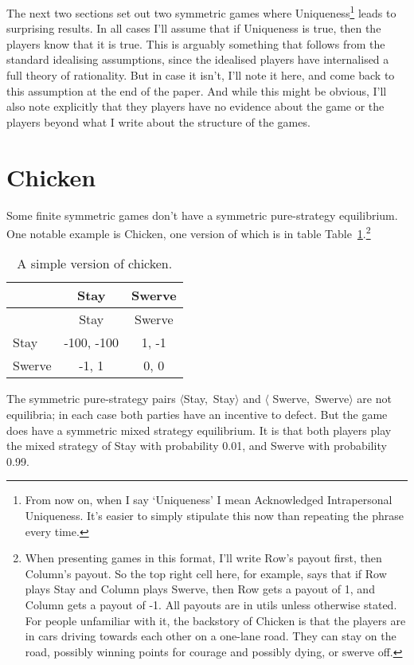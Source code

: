 \documentclass[
  11pt,
  letterpaper,
  DIV=11,
  numbers=noendperiod,
  twoside]{scrartcl}
\begin{document}
The next two sections set out two symmetric games where
Uniqueness\footnote{From now on, when I say `Uniqueness' I mean
  Acknowledged Intrapersonal Uniqueness. It's easier to simply stipulate
  this now than repeating the phrase every time.} leads to surprising
results. In all cases I'll assume that if Uniqueness is true, then the
players know that it is true. This is arguably something that follows
from the standard idealising assumptions, since the idealised players
have internalised a full theory of rationality. But in case it isn't,
I'll note it here, and come back to this assumption at the end of the
paper. And while this might be obvious, I'll also note explicitly that
they players have no evidence about the game or the players beyond what
I write about the structure of the games.

\section{Chicken}\label{chicken}

Some finite symmetric games don't have a symmetric pure-strategy
equilibrium. One notable example is Chicken, one version of which is in
table Table~\ref{tbl-chicken}.\footnote{When presenting games in this
  format, I'll write Row's payout first, then Column's payout. So the
  top right cell here, for example, says that if Row plays Stay and
  Column plays Swerve, then Row gets a payout of 1, and Column gets a
  payout of -1. All payouts are in utils unless otherwise stated. For
  people unfamiliar with it, the backstory of Chicken is that the
  players are in cars driving towards each other on a one-lane road.
  They can stay on the road, possibly winning points for courage and
  possibly dying, or swerve off.}

\begin{longtable}[]{@{}lcc@{}}
\caption{A simple version of chicken.}\label{tbl-chicken}\tabularnewline
\toprule\noalign{}
& Stay & Swerve \\
\midrule\noalign{}
\endfirsthead
\toprule\noalign{}
& Stay & Swerve \\
\midrule\noalign{}
\endhead
\bottomrule\noalign{}
\endlastfoot
Stay & -100, -100 & 1, -1 \\
Swerve & -1, 1 & 0, 0 \\
\end{longtable}

The symmetric pure-strategy pairs \(\langle\)Stay,~Stay\(\rangle\) and
\(\langle\) Swerve,~Swerve\(\rangle\) are not equilibria; in each case
both parties have an incentive to defect. But the game does have a
symmetric mixed strategy equilibrium. It is that both players play the
mixed strategy of Stay with probability 0.01, and Swerve with
probability 0.99.
\end{document}
